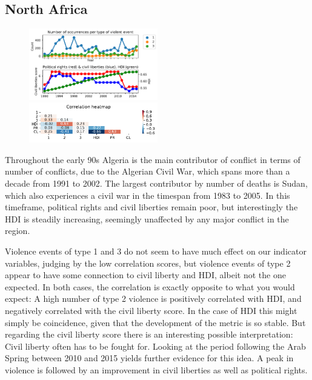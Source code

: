 \documentclass[a4paper,11pt]{article}
\begin{document}
\subsection{North Africa}
\begin{figure}[ht!]
    \includegraphics[width=0.50\textwidth]{images/na.pdf}
    \includegraphics[width=0.50\textwidth]{images/na_corr.pdf}
\end{figure}
Throughout the early 90s Algeria is the main contributor of conflict in terms of number of conflicts, due to the Algerian Civil War, which spans more than a decade from 1991 to 2002. The largest contributor by number of deaths is Sudan, which also experiences a civil war in the timespan from 1983 to 2005. In this timeframe, political rights and civil liberties remain poor, but interestingly the HDI is steadily increasing, seemingly unaffected by any major conflict in the region.

Violence events of type 1 and 3 do not seem to have much effect on our indicator variables, judging by the low correlation scores, but violence events of type 2 appear to have some connection to civil liberty and HDI, albeit not the one expected. In both cases, the correlation is exactly opposite to what you would expect: A high number of type 2 violence is positively correlated with HDI, and negatively correlated with the civil liberty score. In the case of HDI this might simply be coincidence, given that the development of the metric is so stable. But regarding the civil liberty score there is an interesting possible interpretation: Civil liberty often has to be fought for. Looking at the period following the Arab Spring between 2010 and 2015 yields further evidence for this idea. A peak in violence is followed by an improvement in civil liberties as well as political rights.
\end{document}
